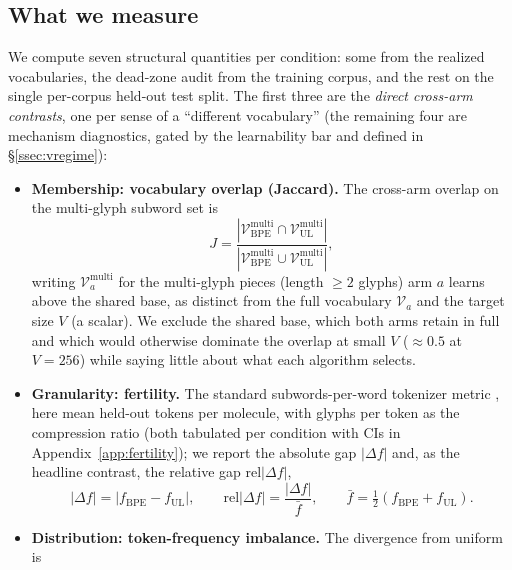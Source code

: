 \documentclass{article}
\begin{document}
\subsection{What we measure}\label{ssec:measurements}

We compute seven structural quantities per condition: some from the realized
vocabularies, the dead-zone audit from the training corpus, and the rest on the
single per-corpus held-out test split. The first three are the
\emph{direct cross-arm contrasts}, one per sense of a ``different vocabulary''
(the remaining four are mechanism diagnostics, gated by the learnability bar and
defined in \S\ref{ssec:vregime}):

\begin{itemize}
  \item \textbf{Membership: vocabulary overlap (Jaccard).} The cross-arm
    overlap on the multi-glyph subword set is
    \begin{equation}\label{eq:jaccard}
      J = \frac{|\mathcal{V}^{\mathrm{multi}}_{\text{BPE}} \cap \mathcal{V}^{\mathrm{multi}}_{\text{UL}}|}{|\mathcal{V}^{\mathrm{multi}}_{\text{BPE}} \cup \mathcal{V}^{\mathrm{multi}}_{\text{UL}}|},
    \end{equation}
    writing $\mathcal{V}^{\mathrm{multi}}_a$ for the multi-glyph pieces
    (length $\ge 2$ glyphs) arm $a$ learns above the shared base, as distinct
    from the full vocabulary $\mathcal{V}_a$ and the target size $V$ (a scalar).
    We exclude the shared base, which both arms retain in full and which would
    otherwise dominate the overlap at small $V$ ($\approx 0.5$ at $V{=}256$)
    while saying little about what each algorithm selects.
  \item \textbf{Granularity: fertility.} The standard subwords-per-word
    tokenizer metric \citep{rust2021how}, here mean held-out tokens per
    molecule, with glyphs per token as the compression ratio (both tabulated per
    condition with CIs in Appendix~\ref{app:fertility}); we report the absolute gap
    $|\Delta f|$ and, as the headline contrast, the relative gap
    $\mathrm{rel}|\Delta f|$,
    \begin{equation}\label{eq:fertility}
      |\Delta f| = |f_{\text{BPE}}-f_{\text{UL}}|, \qquad
      \mathrm{rel}|\Delta f| = \frac{|\Delta f|}{\bar{f}}, \qquad
      \bar{f} = \tfrac{1}{2}(f_{\text{BPE}}+f_{\text{UL}}).
    \end{equation}
  \item \textbf{Distribution: token-frequency imbalance.} The divergence from
    uniform \citep{gowda2020optimal-vocab-nmt} is

\end{itemize}
\end{document}
